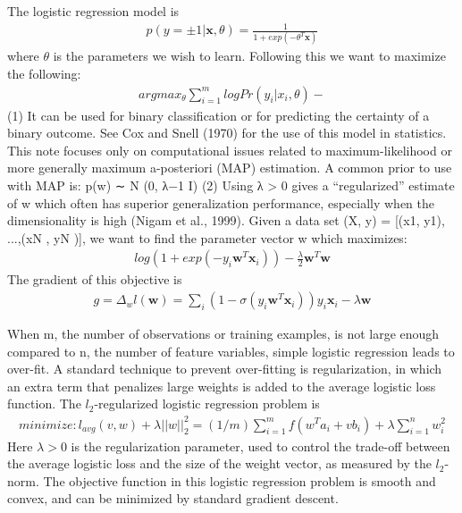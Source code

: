  The logistic regression model is
  \begin{eqnarray} 
 p(y = ±1|\textbf{x}, \theta) = \frac{1}{1 + exp( - \theta^T \textbf{x})}
  \end{eqnarray}
  where $\theta$ is the parameters we wish to learn. Following this we want to maximize the following:
  \begin{eqnarray}
  argmax_\theta \sum_{i=1}^{m} log Pr(y_i | x_i,\theta) - 
    \end{eqnarray}
 (1)
 It can be used for binary classification or for predicting the certainty of a binary outcome. See Cox  and Snell (1970) for the use of this model in statistics. This note focuses only on computational issues related
 to maximum-likelihood or more generally maximum a-posteriori (MAP) estimation. A common
 prior to use with MAP is:
 p(w) ∼ N (0, λ−1  I) (2)
 Using λ > 0 gives a “regularized” estimate of w which often has superior generalization performance,
 especially when the dimensionality is high (Nigam et al., 1999).
 Given a data set (X, y) = [(x1, y1), ...,(xN , yN )], we want to find the parameter vector w which
 maximizes:
 \begin{eqnarray} 
 log(1 + exp(−y_i \textbf{w}^T \textbf{x}_i)) - \frac{\lambda}{2} \textbf{w}^T \textbf{w}
\end{eqnarray}
 The gradient of this objective is
 \begin{eqnarray} 
 g = \Delta_w l (\textbf{w}) = \sum_{i}^{} (1 - \sigma(y_i \textbf{w}^T	\textbf{x}_i)) y_i \textbf{x}_i - \lambda \textbf{w}
\end{eqnarray} 

When m, the number of observations or training examples, is not large enough compared to n, the number of feature variables, simple logistic regression leads to over-fit. A standard technique to prevent over-fitting is regularization, in which an extra term that penalizes large weights is added to the average logistic loss function. The $l_2$-regularized logistic regression problem is
\begin{eqnarray}
minimize:	  l_{avg}(v,w)+ \lambda||w||^2_2 = (1/m) \sum_{i=1}^{m} f(w^T a_i +vb_i) + \lambda \sum_{i=1}^{n} w_i^2
\end{eqnarray}
Here $\lambda > 0$ is the regularization parameter, used to control the trade-off between the average logistic loss and the size of the weight vector, as measured by the $l_2$-norm. The objective function in this logistic regression problem is smooth and convex, and can be minimized by standard gradient descent.


